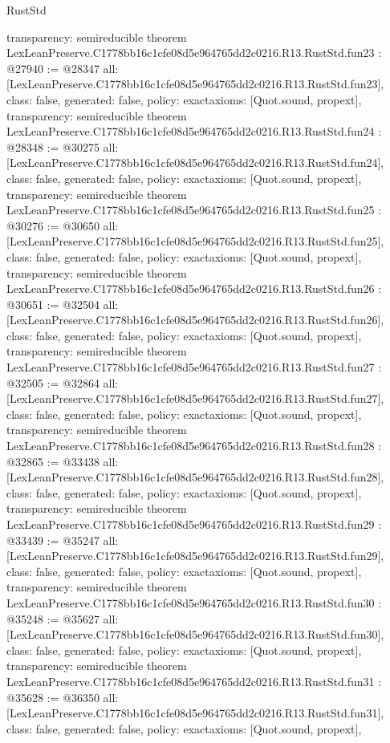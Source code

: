 \begin{lexlean}{RustStd}
\begin{coremodule}
{  transparency: semireducible
}
theorem LexLeanPreserve.C1778bb16c1cfe08d5e964765dd2c0216.R13.RustStd.fun23 : @27940 := @28347 {
  all: [LexLeanPreserve.C1778bb16c1cfe08d5e964765dd2c0216.R13.RustStd.fun23],
  class: false,
  generated: false,
  policy: exact{axioms: [Quot.sound, propext]},
  transparency: semireducible
}
theorem LexLeanPreserve.C1778bb16c1cfe08d5e964765dd2c0216.R13.RustStd.fun24 : @28348 := @30275 {
  all: [LexLeanPreserve.C1778bb16c1cfe08d5e964765dd2c0216.R13.RustStd.fun24],
  class: false,
  generated: false,
  policy: exact{axioms: [Quot.sound, propext]},
  transparency: semireducible
}
theorem LexLeanPreserve.C1778bb16c1cfe08d5e964765dd2c0216.R13.RustStd.fun25 : @30276 := @30650 {
  all: [LexLeanPreserve.C1778bb16c1cfe08d5e964765dd2c0216.R13.RustStd.fun25],
  class: false,
  generated: false,
  policy: exact{axioms: [Quot.sound, propext]},
  transparency: semireducible
}
theorem LexLeanPreserve.C1778bb16c1cfe08d5e964765dd2c0216.R13.RustStd.fun26 : @30651 := @32504 {
  all: [LexLeanPreserve.C1778bb16c1cfe08d5e964765dd2c0216.R13.RustStd.fun26],
  class: false,
  generated: false,
  policy: exact{axioms: [Quot.sound, propext]},
  transparency: semireducible
}
theorem LexLeanPreserve.C1778bb16c1cfe08d5e964765dd2c0216.R13.RustStd.fun27 : @32505 := @32864 {
  all: [LexLeanPreserve.C1778bb16c1cfe08d5e964765dd2c0216.R13.RustStd.fun27],
  class: false,
  generated: false,
  policy: exact{axioms: [Quot.sound, propext]},
  transparency: semireducible
}
theorem LexLeanPreserve.C1778bb16c1cfe08d5e964765dd2c0216.R13.RustStd.fun28 : @32865 := @33438 {
  all: [LexLeanPreserve.C1778bb16c1cfe08d5e964765dd2c0216.R13.RustStd.fun28],
  class: false,
  generated: false,
  policy: exact{axioms: [Quot.sound, propext]},
  transparency: semireducible
}
theorem LexLeanPreserve.C1778bb16c1cfe08d5e964765dd2c0216.R13.RustStd.fun29 : @33439 := @35247 {
  all: [LexLeanPreserve.C1778bb16c1cfe08d5e964765dd2c0216.R13.RustStd.fun29],
  class: false,
  generated: false,
  policy: exact{axioms: [Quot.sound, propext]},
  transparency: semireducible
}
theorem LexLeanPreserve.C1778bb16c1cfe08d5e964765dd2c0216.R13.RustStd.fun30 : @35248 := @35627 {
  all: [LexLeanPreserve.C1778bb16c1cfe08d5e964765dd2c0216.R13.RustStd.fun30],
  class: false,
  generated: false,
  policy: exact{axioms: [Quot.sound, propext]},
  transparency: semireducible
}
theorem LexLeanPreserve.C1778bb16c1cfe08d5e964765dd2c0216.R13.RustStd.fun31 : @35628 := @36350 {
  all: [LexLeanPreserve.C1778bb16c1cfe08d5e964765dd2c0216.R13.RustStd.fun31],
  class: false,
  generated: false,
  policy: exact{axioms: [Quot.sound, propext]},
}
\end{coremodule}
\end{lexlean}
